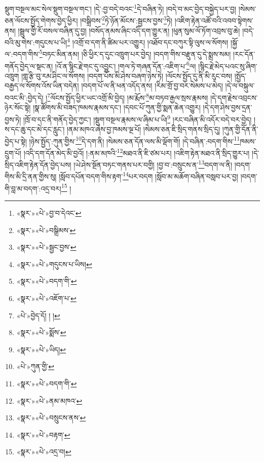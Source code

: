 སྡུག་བསྔལ་མང་སེལ་སྡུག་བསྔལ་གང་། །དེ་:བྱ་བདེ་བའང་\footnote{«སྣར་»«པེ་»བྱ་བ་དེའང་}དེ་བཞིན་ཏེ། །བདེ་བ་མང་བྱེད་བསྐྱེད་པར་བྱ། །སེམས་ཅན་ལོངས་སྤྱོད་གེགས་བྱེད་ཕྱིར། །བསྒྲིབས་\footnote{«སྣར་»«པེ་»བསྒྲིམས་}ཏེ་ཉོན་མོངས་:སྦྱངས་བྱས་\footnote{«སྣར་»«པེ་»སྦྱང་བྱས་}ཏེ། །འཇིག་རྟེན་འཚོ་བའི་འབབ་སྟེགས་ནས། །སྦྲུལ་གྱི་རོ་བསལ་བཞིན་དུ་བྱ། །བསོད་ནམས་ཞིང་འདི་དག་གྱུར་ན། །ཕུན་སུམ་ལོ་ཏོག་འབྲས་བུ་ཆེ། །བདེ་བའི་མུ་གེས་:གདུངས་པ་ཡི།\footnote{«སྣར་»«པེ་»གདུངས་པ་ཡིས།} །འགྲོ་བ་དག་ནི་ཚིམ་པར་འགྱུར། །འཐོབ་དང་བཀུར་སྟི་ལུས་ལ་སོགས། །སྐྱོ་ལ་:བདག་གིས་\footnote{«སྣར་»«པེ་»བདག་གི་}བཏང་མིན་ནམ། །ཅི་ཕྱིར་ད་དུང་འཁྲུག་པར་བྱེད། །བདག་གིས་བརྫུན་དུ་དེ་སྨྲས་སམ། །རང་དོན་གནོད་བྱེད་ལ་སྡང་ན། །འོ་ན་སྙིང་རྗེ་གང་དུ་འབྱུང་། །གལ་ཏེ་གཞན་དོན་:འཇིག་པ་\footnote{«སྣར་»«པེ་»འཇོག་པ་}ལ། །སྙིང་རྗེ་མེད་པའང་སུ་ཞིག་འཁྲུག །གླ་རྩི་བུ་རམ་ཤིང་ལ་སོགས། །བདག་པོས་མི་ཤེས་བཞག་ཉེས་ཏེ། །ལོངས་སྤྱོད་དུ་ནི་མི་རུང་བས། །སྤྱོད་བརྒྱད་ལ་སོགས་འོས་ཡིན་བདེན། །བདག་པོ་ལ་ནི་ཕན་འདོད་ནས། །རིམ་གྲོ་བྱ་བར་སེམས་པ་མེད། །དེ་ལ་བསྐུལ་བའང་མི་:བྱེད་དེ། །\footnote{«པེ་»བྱེད་དོ། ། །}ལོངས་སྤྱོད་ཕྱིར་ཡང་འགྲོ་མི་བྱེད། །མ་རྨོས་\footnote{«སྣར་»«པེ་»སྨོས་}མ་བཏབ་རྒྱལ་སྲས་རྣམས། །དེ་དག་རྗེས་འབྲངས་ཉེར་སོང་སྟེ། །སྣ་ཚོགས་མི་བཟད་ཁམས་རྣམས་དང་། །དབང་པོ་ཀུན་གྱི་སྨན་ཆེན་འགྱུར། །དེ་དག་ཤེས་བྱས་དྲན་བྱས་ཏེ། །ཁྲོ་བ་དང་ནི་གནོད་བྱེད་ཀྱང་། །སྡུག་བསྔལ་རྣམས་ལ་ཞིམ་པ་ཡི།\footnote{«སྣར་»«པེ་»ཡིད།} །རང་བཞིན་མི་འདོར་བདེ་བར་བྱེད། །ས་དང་ཆུ་དང་མེ་དང་རླུང་། །ནམ་མཁའ་ཞེས་བྱ་ཁམས་ལྔ་པོ། །སེམས་ཅན་ཇི་སྲིད་གནས་སྲིད་དུ། །ཀུན་གྱི་དོན་ནི་བྱེད་པ་སྟེ། །ཉེས་སྤྱོད་:ཀུན་གྱིས་\footnote{«པེ་»ཀུན་གྱི་}དེ་དག་ནི། །སེམས་ཅན་དོན་ལས་མི་ལྡོག་གོ། །དེ་བཞིན་:བདག་གིས་\footnote{«སྣར་»«པེ་»བདག་གི་}ཁམས་དྲུག་པོ། །འདི་དག་དོན་མེད་མི་བྱའོ། །:ནམ་མཁའི་\footnote{«སྣར་»«པེ་»ནམ་མཁའ་}མཐའ་ནི་ཇི་ཙམ་པར། །འཇིག་རྟེན་མཐའ་ནི་སྲིད་གྱུར་པ། །དེ་སྲིད་འཇིག་རྟེན་དོན་བྱེད་པས། །ཡེ་ཤེས་སྔོན་བཏང་གནས་པར་བགྱི། །བྱ་བ་:བསྲུངས་ན་\footnote{«སྣར་»«པེ་»བསྲུངས་ནས་}བདག་ལ་ནི། །བདག་གིས་མི་དྲི་ནན་གྱིས་སུ། །སློབ་དཔོན་བདག་གིས་རྟག་\footnote{«སྣར་»«པེ་»བརྟག་}པར་བདག །སློབ་མ་མཆོག་བཞིན་བསླབ་པར་བྱ། །བདག་གི་བླ་མ་བདག་:འདྲ་བར།\footnote{«སྣར་»«པེ་»འདྲ་བ།} །
